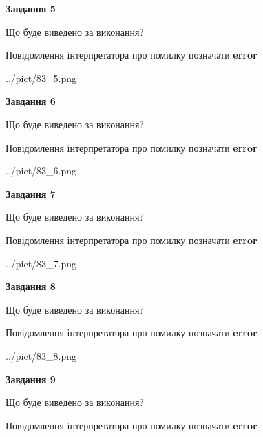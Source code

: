\documentclass[11pt, ukrainian]{article}
\begin{document}
{\begin {large}
{\begin {center}\textbf{Завдання 5}\end {center}}\par
Що буде виведено за виконання? \par
Повідомлення інтерпретатора про помилку позначати \textbf{error}

\begin{center}
	{../pict/83_5.png}
\end{center}
\newpage

{\begin {center}\textbf{Завдання 6}\end {center}}\par
Що буде виведено за виконання? \par
Повідомлення інтерпретатора про помилку позначати \textbf{error}

\begin{center}
	{../pict/83_6.png}
\end{center}
\newpage

{\begin {center}\textbf{Завдання 7}\end {center}}\par
Що буде виведено за виконання? \par
Повідомлення інтерпретатора про помилку позначати \textbf{error}

\begin{center}
	{../pict/83_7.png}
\end{center}
\newpage

{\begin {center}\textbf{Завдання 8}\end {center}}\par
Що буде виведено за виконання? \par
Повідомлення інтерпретатора про помилку позначати \textbf{error}

\begin{center}
	{../pict/83_8.png}
\end{center}
\newpage

{\begin {center}\textbf{Завдання 9}\end {center}}\par
Що буде виведено за виконання? \par
Повідомлення інтерпретатора про помилку позначати \textbf{error}


\end{large}}
\end{document}
